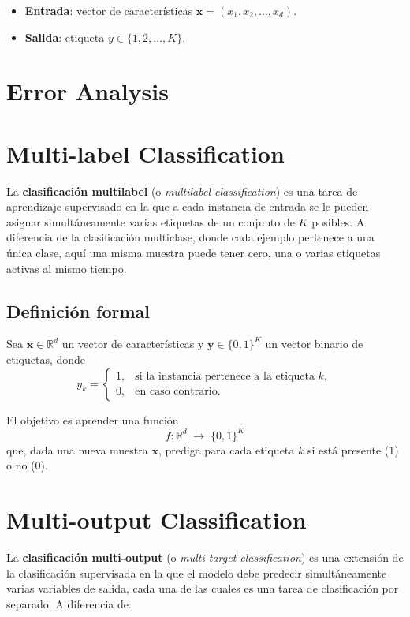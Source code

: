 \documentclass{article}
\begin{document}
\begin{itemize}
  \item \textbf{Entrada}: vector de características \(\mathbf{x} = (x_1, x_2, \dots, x_d)\).
  \item \textbf{Salida}: etiqueta \(y \in \{1,2,\dots,K\}\).
\end{itemize}
\section{Error Analysis}
\section{Multi-label Classification }

La \textbf{clasificación multilabel} (o \emph{multilabel classification}) es una tarea de aprendizaje supervisado en la que a cada instancia de entrada se le pueden asignar simultáneamente varias etiquetas de un conjunto de \(K\) posibles. A diferencia de la clasificación multiclase, donde cada ejemplo pertenece a una única clase, aquí una misma muestra puede tener cero, una o varias etiquetas activas al mismo tiempo.

\subsection*{Definición formal}

Sea \(\mathbf{x}\in\mathbb{R}^d\) un vector de características y \(\mathbf{y}\in\{0,1\}^K\) un vector binario de etiquetas, donde
\[
y_k =
\begin{cases}
1, & \text{si la instancia pertenece a la etiqueta }k,\\
0, & \text{en caso contrario}.
\end{cases}
\]

El objetivo es aprender una función
\[
f: \mathbb{R}^d \;\longrightarrow\;\{0,1\}^K
\]
que, dada una nueva muestra \(\mathbf{x}\), prediga para cada etiqueta \(k\) si está presente (\(1\)) o no (\(0\)).

\section{Multi-output Classification}
La \textbf{clasificación multi-output} (o \emph{multi-target classification}) es una extensión de la clasificación supervisada en la que el modelo debe predecir simultáneamente varias variables de salida, cada una de las cuales es una tarea de clasificación por separado. A diferencia de:
\end{document}
